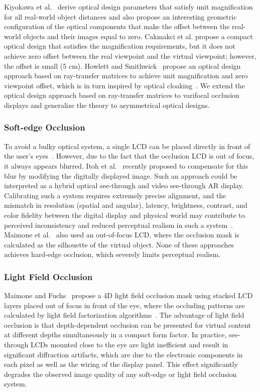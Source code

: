 Kiyokawa et al.~\cite{Kiyokawa2003} derive optical design parameters that satisfy unit magnification for all real-world object distances and also propose an interesting geometric configuration of the optical components that make the offset between the real-world objects and their images equal to zero.
Cakmakci et al. \cite{Cakmakci2004} propose a compact optical design that satisfies the magnification requirements, but it does not achieve zero offset between the real viewpoint and the virtual viewpoint; however, the offset is small (5 cm). 
Howlett and Smithwick~\cite{Howlett2017} propose an optical design approach based on ray-transfer matrices to achieve unit magnification and zero viewpoint offset, which is in turn inspired by optical cloaking~\cite{Choi2015}.
We extend the optical design approach based on ray-transfer matrices to varifocal occlusion displays and generalize the theory to asymmetrical optical designs.  

\subsubsection{Soft-edge Occlusion} 

To avoid a bulky optical system, a single LCD can be placed directly in front of the user's eyes~\cite{Wetzstein2010,Itoh2017}. However, due to the fact that the occlusion LCD is out of focus, it always appears blurred. Itoh et al.~\cite{Itoh2017} recently proposed to compensate for this blur by modifying the digitally displayed image.
Such an approach could be interpreted as a hybrid optical see-through and video see-through AR display. 
Calibrating such a system requires extremely precise alignment, and the mismatch in resolution (spatial and angular), latency, brightness, contrast, and color fidelity between the digital display and physical world may contribute to perceived inconsistency and reduced perceptual realism in such a system~\cite{Rolland2000}. 
Maimone et al.~\cite{Maimone2014Pinlight} also used an out-of-focus LCD, where the occlusion mask is calculated as the silhouette of the virtual object. None of these approaches achieves hard-edge occlusion, which severely limits perceptual realism.

\subsubsection{Light Field Occlusion}
Maimone and Fuchs~\cite{maimone2013general} propose a 4D light field occlusion mask using stacked LCD layers placed out of focus in front of the eye, where the occluding patterns are calculated by light field factorization algorithms~\cite{Lanman2010, Wetzstein2012}. 
The advantage of light field occlusion is that depth-dependent occlusion can be presented for virtual content at different depths simultaneously in a compact form factor. 
In practice, see-through LCDs mounted close to the eye are light inefficient and result in significant diffraction artifacts, which are due to the electronic components in each pixel as well as the wiring of the display panel. This effect significantly degrades the observed image quality of any soft-edge or light field occlusion system. 

